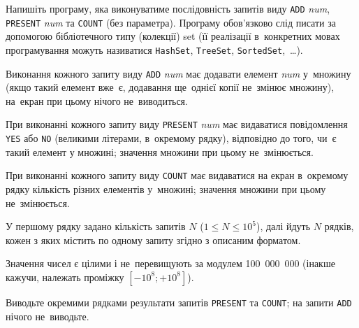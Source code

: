 ﻿Напишіть програму, яка виконуватиме послідовність запитів виду {\tt ADD} {\it num}, {\tt PRESENT} {\it num} та {\tt COUNT} (без параметра). Програму обов'язково слід писати за допомогою бібліотечного типу (колекції) set (її реалізації в~конкретних мовах програмування можуть називатися {\tt HashSet}, {\tt TreeSet}, {\tt SortedSet},~\dots).

Виконання кожного запиту виду {\tt ADD} {\it num} має додавати елемент {\it num} у~множину (якщо такий елемент вже~є, додавання ще~однієї копії не~змінює множину), на~екран при цьому нічого не~виводиться.

При виконанні кожного запиту виду {\tt PRESENT} {\it num} має видаватися повідомлення {\tt YES} або {\tt NO} (великими літерами, в~окремому рядку), відповідно до того, чи~є такий елемент у множині; значення множини при цьому не~змінюється.

При виконанні кожного запиту виду {\tt COUNT} має видаватися на екран в~окремому рядку кількість різних елементів у~множині; значення множини при цьому не~змінюється.


\InputFile

У першому рядку задано кількість запитів $N$ ($1\leqslant N\leqslant 10^5$), далі йдуть $N$ рядків, кожен з яких містить по одному запиту згідно з описаним форматом.

Значення чисел є цілими і не~перевищують за модулем 100~000~000  (інакше кажучи, належать проміжку $[-10^8; +10^8]$).


\OutputFile

Виводьте окремими рядками результати запитів {\tt PRESENT} та {\tt COUNT}; на запити {\tt ADD} нічого не~виводьте.


\Examples

\begin{example}
\end{example}